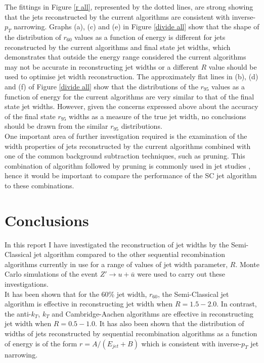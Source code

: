 \documentclass[a4paper,11pt, onecolumn]{article}
\begin{document}
  The fittings in Figure \ref{r all}, represented by the dotted lines, are strong showing that the jets reconstructed by the current algorithms are consistent with 
  inverse-$p_T$ narrowing. 
  Graphs (a), (c) and (e) in Figure \ref{divide all} show that the shape of the distribution of $r_{60}$ values as a function of energy is different for 
  jets reconstructed by the current algorithms and final state jet widths, 
  which demonstrates that outside the energy range considered the current algorithms may not be accurate in reconstructing jet widths or a different $R$ value 
  should be used to optimise jet width reconstruction. The approximately flat lines in (b), (d) and (f) of Figure \ref{divide all} show that the distributions 
  of the $r_{95}$ values as a function of energy for the current algorithms are very similar to that of the final state jet widths. However, given the concerns 
  expressed above about the accuracy of the final state $r_{95}$ widths as a measure of the true jet width, no conclusions should be drawn from the similar $r_{95}$ distributions.\\

  One important area of further investigation required is the examination of the width properties of jets reconstructed by the current algorithms combined with
  one of the common background subtraction techniques, such as pruning. This combination of algorithm followed by pruning is commonly used in jet studies \cite{ATLAS} 
  \cite{CMS}, hence it would be important to compare the performance of the SC jet algorithm to these combinations.


  \section{Conclusions}
  
  In this report I have investigated the reconstruction of jet widths by the Semi-Classical jet algorithm compared to the other sequential recombination algorithms 
  currently in use for a range of values of jet width parameter, $R$. Monte Carlo simulations of the event $Z' \to u + \bar{u}$ were used to carry out these investigations. \\
  
  It has been shown that for the 60\% jet width, $r_{60}$, the Semi-Classical jet algorithm is effective in reconstructing jet width when $R = 1.5-2.0$. In contrast,
  the anti-$k_T$, $k_T$ and Cambridge-Aachen algorithms are effective in reconstructing jet width when $R=0.5-1.0$. It has also been shown that the distribution of widths of 
  jets reconstructed by sequential recombination algorithms as a function of energy is of the form $r = A/(E_{jet}+B)$ which is consistent with inverse-$p_T$ jet narrowing.\\
\end{document}
